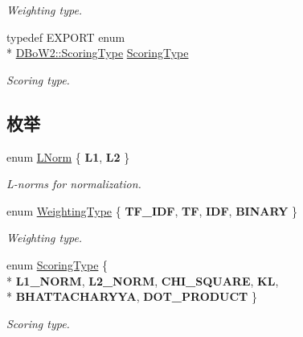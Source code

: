 \begin{DoxyCompactItemize}
\begin{DoxyCompactList}\small\item\em Weighting type. \end{DoxyCompactList}\item 
\hypertarget{namespaceDBoW2_ad047d6578eacc8aaae7d9cbcd3ded537}{typedef E\-X\-P\-O\-R\-T enum \\*
\hyperlink{namespaceDBoW2_aa252a592dd607c6e60dede06ceef2722}{D\-Bo\-W2\-::\-Scoring\-Type} \hyperlink{namespaceDBoW2_ad047d6578eacc8aaae7d9cbcd3ded537}{Scoring\-Type}}\label{namespaceDBoW2_ad047d6578eacc8aaae7d9cbcd3ded537}

\begin{DoxyCompactList}\small\item\em Scoring type. \end{DoxyCompactList}\end{DoxyCompactItemize}
\subsection*{枚举}
\begin{DoxyCompactItemize}
\item 
enum \hyperlink{namespaceDBoW2_a53e9e0bcfc25c861815e413a7cf3fa51}{L\-Norm} \{ {\bfseries L1}, 
{\bfseries L2}
 \}
\begin{DoxyCompactList}\small\item\em L-\/norms for normalization. \end{DoxyCompactList}\item 
enum \hyperlink{namespaceDBoW2_a5de5c8a307aca9a84ffefda2a9bc467a}{Weighting\-Type} \{ {\bfseries T\-F\-\_\-\-I\-D\-F}, 
{\bfseries T\-F}, 
{\bfseries I\-D\-F}, 
{\bfseries B\-I\-N\-A\-R\-Y}
 \}
\begin{DoxyCompactList}\small\item\em Weighting type. \end{DoxyCompactList}\item 
enum \hyperlink{namespaceDBoW2_aa252a592dd607c6e60dede06ceef2722}{Scoring\-Type} \{ \\*
{\bfseries L1\-\_\-\-N\-O\-R\-M}, 
{\bfseries L2\-\_\-\-N\-O\-R\-M}, 
{\bfseries C\-H\-I\-\_\-\-S\-Q\-U\-A\-R\-E}, 
{\bfseries K\-L}, 
\\*
{\bfseries B\-H\-A\-T\-T\-A\-C\-H\-A\-R\-Y\-Y\-A}, 
{\bfseries D\-O\-T\-\_\-\-P\-R\-O\-D\-U\-C\-T}
 \}
\begin{DoxyCompactList}\small\item\em Scoring type. \end{DoxyCompactList}\end{DoxyCompactItemize}
